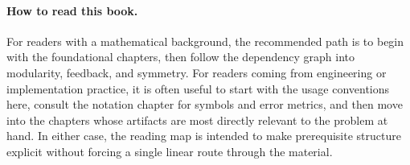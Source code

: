 \paragraph{How to read this book.}
For readers with a mathematical background, the recommended path is to begin with the foundational chapters, then follow the dependency graph into modularity, feedback, and symmetry. For readers coming from engineering or implementation practice, it is often useful to start with the usage conventions here, consult the notation chapter for symbols and error metrics, and then move into the chapters whose artifacts are most directly relevant to the problem at hand. In either case, the reading map is intended to make prerequisite structure explicit without forcing a single linear route through the material.
